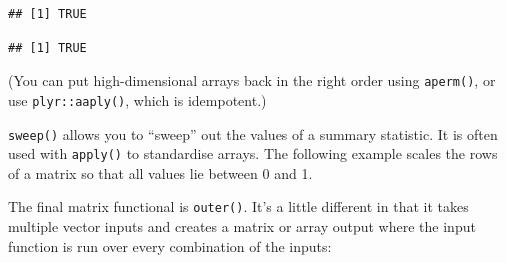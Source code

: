 \begin{verbatim}
## [1] TRUE
\end{verbatim}

\begin{Shaded}
\begin{Highlighting}[]
\StringTok{ }
\end{Highlighting}
\end{Shaded}

\begin{verbatim}
## [1] TRUE
\end{verbatim}

(You can put high-dimensional arrays back in the right order using
\texttt{aperm()}, or use \texttt{plyr::aaply()}, which is idempotent.)

\texttt{sweep()} allows you to ``sweep'' out the values of a summary
statistic. It is often used with \texttt{apply()} to standardise arrays.
The following example scales the rows of a matrix so that all values lie
between 0 and 1. 

\begin{Shaded}
\begin{Highlighting}[]
\StringTok{ }\NormalTok{(}\NormalTok{(}\NormalTok{, }\NormalTok{, }\NormalTok{), } \NormalTok{)}
\StringTok{ }\NormalTok{, }\DataTypeTok{-}\NormalTok{)}
\StringTok{ }\NormalTok{, }\DataTypeTok{/}\NormalTok{)}
\end{Highlighting}
\end{Shaded}

The final matrix functional is \texttt{outer()}. It's a little different
in that it takes multiple vector inputs and creates a matrix or array
output where the input function is run over every combination of the
inputs: 

\begin{Shaded}
\begin{Highlighting}[]
\NormalTok{(}\OperatorTok{:}\NormalTok{, }\OperatorTok{:}\NormalTok{, }\NormalTok{)}
\end{Highlighting}
\end{Shaded}

